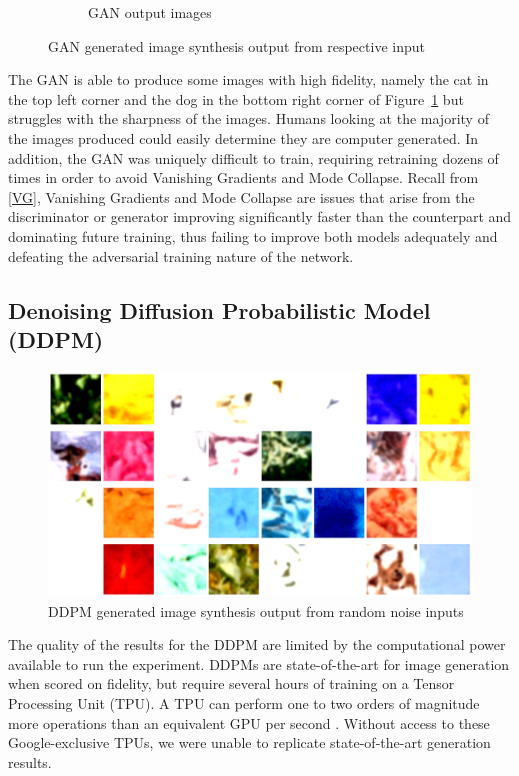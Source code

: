 \documentclass[%
 reprint,
 amsmath,amssymb,
 aps,
]{revtex4-2}
\begin{document}
\begin{figure}[h]
\begin{subfigure}{\columnwidth}
        \caption{GAN output images}
        \label{fig:ganout}
    \end{subfigure}
    \caption{GAN generated image synthesis output from respective input}
    \label{fig:ganresults}
\end{figure}



The GAN is able to produce some images with high fidelity, namely the cat in the top left corner and the dog in the bottom right corner of Figure~\ref{fig:ganout} but struggles with the sharpness of the images. Humans looking at the majority of the images produced could easily determine they are computer generated. In addition, the GAN was uniquely difficult to train, requiring retraining dozens of times in order to avoid Vanishing Gradients and Mode Collapse. Recall from \ref{VG}, Vanishing Gradients and Mode Collapse are issues that arise from the discriminator or generator improving significantly faster than the counterpart and dominating future training, thus failing to improve both models adequately and defeating the adversarial training nature of the network.

\subsection{Denoising Diffusion Probabilistic Model (DDPM)}
\label{ddpm_result_}

\begin{figure}[h]
    \includegraphics[width=0.9\columnwidth]{ddpmout.png}
    \caption{\label{fig:ddpmresults} DDPM generated image synthesis output from random noise inputs}
\end{figure}


The quality of the results for the DDPM are limited by the computational power available to run the experiment. DDPMs are state-of-the-art for image generation when scored on fidelity, but require several hours of training on a Tensor Processing Unit (TPU). A TPU can perform one to two orders of magnitude more operations than an equivalent GPU per second \cite{googlecloud}. Without access to these Google-exclusive TPUs, we were unable to replicate state-of-the-art generation results.
\end{document}
